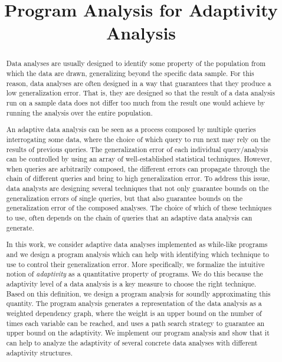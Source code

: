 \documentclass[a4paper,11pt]{article}
\begin{document}
\title{Program Analysis for Adaptivity Analysis}

\author{}

\date{}
\maketitle

\begin{abstract}
    Data analyses are usually designed to identify some property of the population from which the data are drawn, generalizing beyond the specific data sample. For this reason, data analyses are often designed in a way that guarantees that they produce a low generalization error.
    That is, they are designed so that the result of a data analysis run on a sample data does not differ too much from the result one would achieve by running the analysis over the entire population. 
   
   An adaptive data analysis can be seen as a process composed by multiple queries interrogating some data, where the choice of which query to run next may rely on the results of previous queries. 
   The generalization error of each individual query/analysis can be controlled by using an array of well-established statistical techniques.
   However, when queries are arbitrarily composed, the different errors can propagate through the chain of different queries and bring to high generalization error. 
   To address this issue, data analysts are designing several techniques that not only guarantee bounds on the generalization errors of single queries, but that also guarantee bounds on the generalization error of the composed analyses. 
   The choice of which of these techniques to use, often depends on the chain of queries that an adaptive data analysis can generate.
   
   In this work, we consider adaptive data analyses implemented as while-like programs and we design a program analysis which can help with identifying which technique to use to control their generalization error. 
   More specifically, we formalize the intuitive notion of \emph{adaptivity} as a quantitative property of programs. 
   We do this because the adaptivity level of a data analysis is a key measure to choose the right technique. 
   Based on this definition, we design a program analysis for soundly approximating this quantity.
   The program analysis generates a representation of the data analysis as a weighted dependency graph, where the weight is an upper bound on the number of times each variable can be reached, and uses a path search strategy to guarantee an upper bound on the adaptivity. 
   We implement our program analysis  and show that it can help to analyze the adaptivity of several concrete data analyses with different adaptivity structures.
\end{abstract}
\end{document}
